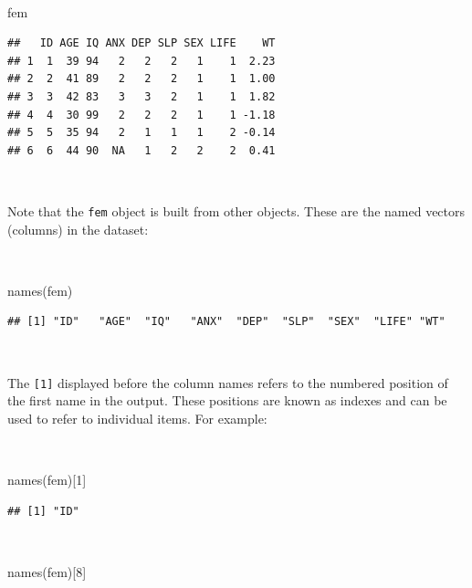 \documentclass[
  12pt,
]{book}
\newenvironment{Shaded}{\begin{snugshade}}{\end{snugshade}}
\newcommand{\DecValTok}[1]{\textcolor[rgb]{0.00,0.00,0.81}{#1}}
\newcommand{\FunctionTok}[1]{\textcolor[rgb]{0.00,0.00,0.00}{#1}}
\newcommand{\NormalTok}[1]{#1}
\begin{document}
~

\begin{Shaded}
\begin{Highlighting}[]
\NormalTok{fem}
\end{Highlighting}
\end{Shaded}

\begin{verbatim}
##   ID AGE IQ ANX DEP SLP SEX LIFE    WT
## 1  1  39 94   2   2   2   1    1  2.23
## 2  2  41 89   2   2   2   1    1  1.00
## 3  3  42 83   3   3   2   1    1  1.82
## 4  4  30 99   2   2   2   1    1 -1.18
## 5  5  35 94   2   1   1   1    2 -0.14
## 6  6  44 90  NA   1   2   2    2  0.41
\end{verbatim}

~

Note that the \texttt{fem} object is built from other objects. These are the named vectors (columns) in the dataset:

~

\begin{Shaded}
\begin{Highlighting}[]
\FunctionTok{names}\NormalTok{(fem)}
\end{Highlighting}
\end{Shaded}

\begin{verbatim}
## [1] "ID"   "AGE"  "IQ"   "ANX"  "DEP"  "SLP"  "SEX"  "LIFE" "WT"
\end{verbatim}

~

The \texttt{{[}1{]}} displayed before the column names refers to the numbered position of the first name in the output. These positions are known as indexes and can be used to refer to individual items. For example:

~

\begin{Shaded}
\begin{Highlighting}[]
\FunctionTok{names}\NormalTok{(fem)[}\DecValTok{1}\NormalTok{]}
\end{Highlighting}
\end{Shaded}

\begin{verbatim}
## [1] "ID"
\end{verbatim}

~

\begin{Shaded}
\begin{Highlighting}[]
\FunctionTok{names}\NormalTok{(fem)[}\DecValTok{8}\NormalTok{]}
\end{Highlighting}
\end{Shaded}
\end{document}
